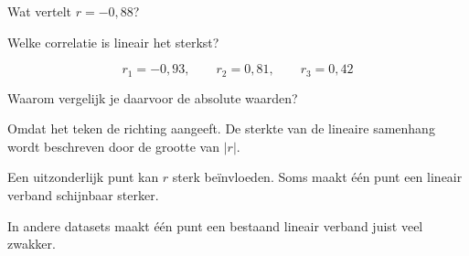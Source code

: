 \documentclass{ximera}
\begin{document}
\begin{oefening}{\oefB \ESS}
\begin{question}
Wat vertelt $r=-0{,}88$?

\begin{multipleChoice}
\end{multipleChoice}
\end{question}

\begin{question}
Welke correlatie is lineair het sterkst?

\[
r_1=-0{,}93,\qquad r_2=0{,}81,\qquad r_3=0{,}42
\]

\begin{multipleChoice}
\end{multipleChoice}
\end{question}

\begin{question}
Waarom vergelijk je daarvoor de absolute waarden?

\begin{oplossing}
Omdat het teken de richting aangeeft. De sterkte van de lineaire
samenhang wordt beschreven door de grootte van $|r|$.
\end{oplossing}
\end{question}
\end{oefening}





Een uitzonderlijk punt kan $r$ sterk beïnvloeden. Soms maakt één punt
een lineair verband schijnbaar sterker.

In andere datasets maakt één punt een bestaand lineair verband juist
veel zwakker.
\end{document}
